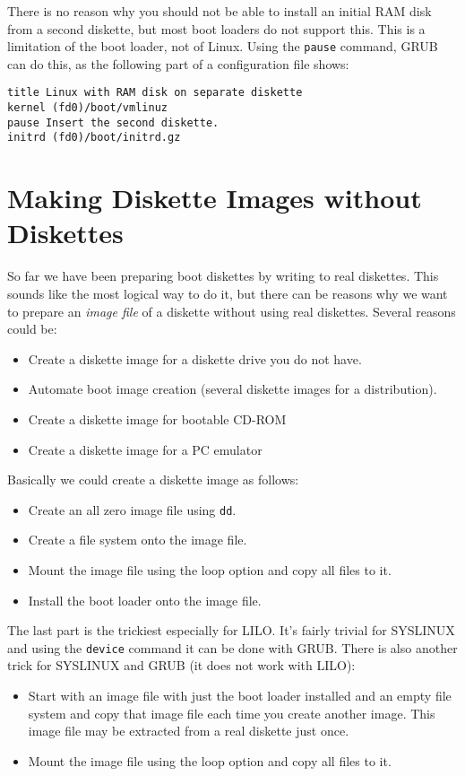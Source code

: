 \documentclass[12pt,a4paper]{article}
\begin{document}
There is no reason why you should not be able to install an 
initial RAM disk from a second diskette, but most boot loaders do not
support this. This is a limitation of the boot loader, not of
Linux. Using the {\tt pause} command, GRUB can do this, as the
following part of a configuration file shows:
\begin{verbatim}
title Linux with RAM disk on separate diskette
kernel (fd0)/boot/vmlinuz 
pause Insert the second diskette.
initrd (fd0)/boot/initrd.gz
\end{verbatim}

\section{Making Diskette Images without Diskettes}

So far we have been preparing boot diskettes by writing to real
diskettes. This sounds like the most logical way to do it, but there
can be reasons why we want to prepare an {\em image file} of a
diskette without using real diskettes. Several reasons could be:
\begin{itemize}
\item Create a diskette image for a diskette drive you do not have.
\item Automate boot image creation (several diskette images for a
  distribution). 
\item Create a diskette image for bootable CD-ROM
\item Create a diskette image for a PC emulator
\end{itemize}

Basically we could create a diskette image as follows:
\begin{itemize}
\item Create an all zero image file using {\tt dd}.
\item Create a file system onto the image file.
\item Mount the image file using the loop option and copy all files to
  it.
\item Install the boot loader onto the image file.
\end{itemize}
The last part is the trickiest especially for LILO. It's fairly
trivial for SYSLINUX and using the {\tt device} command it can be done
with GRUB. There is also another trick for SYSLINUX and GRUB (it does
not work with LILO):
\begin{itemize}
\item Start with an image file with just the boot loader installed and
  an empty file system and copy that image file each time you create
  another image. This image file may be extracted from a real diskette
  just once.
\item Mount the image file using the loop option and copy all files to
  it.
\end{itemize}
\end{document}
